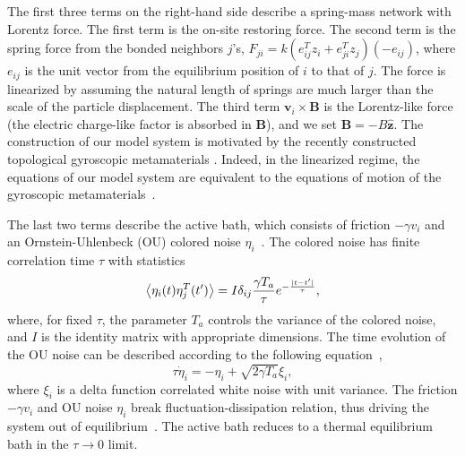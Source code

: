 \documentclass[
 preprint,
 preprintnumbers,
 amsmath,amssymb,
 aps,
 pre,
 longbibliography,
 superscriptaddress,
 10pt, twocolumn
]{revtex4-1}
\begin{document}
The first three terms on the right-hand side describe a spring-mass network with Lorentz force.
The first term is the on-site restoring force.
The second term is the spring force from the bonded neighbors $j$'s,
$F_{ji} = k (e_{ij}^T z_i + e_{ji}^T z_j) (-e_{ij})$, where $e_{ij}$ is the unit vector from the equilibrium position of $i$ to that of $j$. The force is linearized by assuming the natural length of springs are much larger than the scale of the particle displacement.
The third term $\bm{v}_i\times\bm{B}$ is the Lorentz-like force (the electric charge-like factor is absorbed in $\bm{B}$), and we set $\bm{B} = -B\mathbf{\hat{z}}$.
The construction of our model system is motivated by the recently constructed topological gyroscopic metamaterials \cite{Nash2015TopologicalMechanics}. Indeed, in the linearized regime, the equations of our model system are equivalent to the equations of motion of the gyroscopic metamaterials~\cite{Lee2018TopologicalDynamics}.

The last two terms describe the active bath, which consists of friction $-\gamma v_i$ and an Ornstein-Uhlenbeck (OU) colored noise $\eta_i$~\cite{Fodor2016HowFar}.
The colored noise has finite correlation time $\tau$ with statistics
\begin{equation} \label{eqn:noise_correlation}
    \expval{\eta_i(t)\eta_{j}^T(t')} = I\delta_{ij}\frac{\gamma T_a}{\tau} e^{-\frac{|t-t'|}{\tau}} ,
\end{equation}
where, for fixed $\tau$, the parameter $T_a$ controls the variance of the colored noise, and $I$ is the identity matrix with appropriate dimensions.
The time evolution of the OU noise can be described according to the following equation~\cite{Hanggi1994ColoredNoise},
\begin{equation} \label{eqn:noise_eom}
    \tau \dot{\eta}_i = -\eta_i + \sqrt{2\gamma T_a}\xi_i ,
\end{equation}
where $\xi_i$ is a delta function correlated white noise with unit variance.
The friction $-\gamma v_i$ and OU noise $\eta_i$ break fluctuation-dissipation relation, thus driving the system out of equilibrium~\cite{Fodor2016HowFar}.
The active bath reduces to a thermal equilibrium bath in the $\tau \rightarrow 0$ limit.
\end{document}
